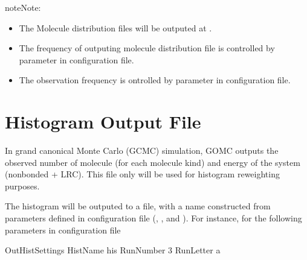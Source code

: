 \documentclass[letterpaper,10pt,english]{sphinxmanual}
\begin{document}
\begin{sphinxadmonition}{note}{Note:}\begin{itemize}
\item {} 
\sphinxAtStartPar
The Molecule distribution files will be outputed at .

\item {} 
\sphinxAtStartPar
The frequency of outputing molecule distribution file is controlled by 
parameter in configuration file.

\item {} 
\sphinxAtStartPar
The observation frequency is ontrolled by  parameter in configuration file.

\end{itemize}
\end{sphinxadmonition}


\section{Histogram Output File}
\label{\detokenize{output_file:histogram-output-file}}
\sphinxAtStartPar
In grand canonical Monte Carlo (GCMC) simulation, GOMC outputs the observed number of molecule (for each
molecule kind) and energy of the system (nonbonded + LRC). This file only will be used for histogram
reweighting purposes.

\sphinxAtStartPar
The histogram will be outputed to a file, with a name constructed from parameters defined
in configuration file (, , and ). For instance, for
the following parameters in configuration file

\begin{sphinxVerbatim}[commandchars=\\\{\}]
\PYGZsh{}\PYGZsh{}\PYGZsh{}\PYGZsh{}\PYGZsh{}\PYGZsh{}\PYGZsh{}\PYGZsh{}\PYGZsh{}\PYGZsh{}\PYGZsh{}\PYGZsh{}\PYGZsh{}\PYGZsh{}\PYGZsh{}\PYGZsh{}\PYGZsh{}\PYGZsh{}\PYGZsh{}\PYGZsh{}\PYGZsh{}\PYGZsh{}\PYGZsh{}\PYGZsh{}\PYGZsh{}\PYGZsh{}\PYGZsh{}\PYGZsh{}\PYGZsh{}\PYGZsh{}\PYGZsh{}\PYGZsh{}\PYGZsh{}
\PYGZsh{} OutHistSettings
\PYGZsh{}\PYGZsh{}\PYGZsh{}\PYGZsh{}\PYGZsh{}\PYGZsh{}\PYGZsh{}\PYGZsh{}\PYGZsh{}\PYGZsh{}\PYGZsh{}\PYGZsh{}\PYGZsh{}\PYGZsh{}\PYGZsh{}\PYGZsh{}\PYGZsh{}\PYGZsh{}\PYGZsh{}\PYGZsh{}\PYGZsh{}\PYGZsh{}\PYGZsh{}\PYGZsh{}\PYGZsh{}\PYGZsh{}\PYGZsh{}\PYGZsh{}\PYGZsh{}\PYGZsh{}\PYGZsh{}\PYGZsh{}\PYGZsh{}
HistName   his
RunNumber  3
RunLetter  a
\end{sphinxVerbatim}
\end{document}
